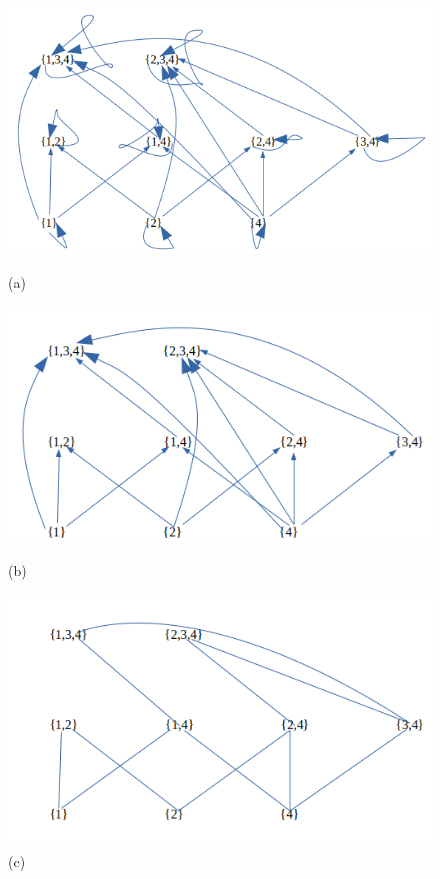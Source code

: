 \documentclass[a4 paper]{article}
\numberwithin{equation}{section}
\newcommand{\0}{\mathbf{0}}
\begin{document}
\begin{figure}[htp]
    \centering
	\includegraphics[scale=0.5]{a2.png}
	\caption{(a)}
	\label{fig: hasse diagram}
	
	\centering
	\includegraphics[scale=0.5]{b2.png}
	\caption{(b)}
	\label{fig: hasse diagram}
	
	\centering
	\includegraphics[scale=0.5]{c2.png}
	\caption{(c)}
	\label{fig: hasse diagram}
	
\end{figure}
\end{document}
